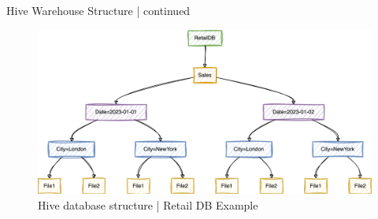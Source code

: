 \begin{frame}[fragile]{Hive Warehouse Structure | continued}

\begin{figure}
	\includegraphics[width=\textwidth,height=.65\textheight]{./Figures/chapter-03/mermaid-diagram-retail_db.png}
	
	\caption{Hive database structure | Retail DB Example}	
\end{figure}
\end{frame}
